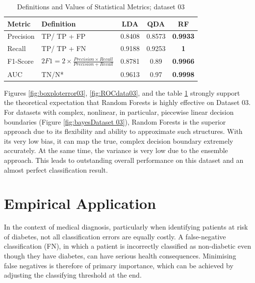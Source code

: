 \documentclass[12pt,a4paper,titlepage]{article}
\numberwithin{equation}{section}
\numberwithin{table}{section}
\numberwithin{figure}{section}
\begin{document}
        \begin{table}[h]
            \centering
            \begin{tabular}{llccc}
            \toprule
            \textbf{Metric} & \textbf{Definition} & \textbf{LDA} & \textbf{QDA} & \textbf{RF} \\
            \midrule
            Precision   & TP/ TP + FP       & 0.8408 & 0.8573 & \textbf{0.9933}                      \\
            Recall    & TP/ TP + FN       & 0.9188 &0.9253 & \textbf{1}     \\
        F1-Score  & $2F1 = 2 \times \frac{Precision\times Recall}{Precision + Recall}$      & 0.8781 & 0.89 & \textbf{0.9966}           \\
            AUC  & TN/N*      &   0.9613 & 0.97 & \textbf{0.9998}                                                \\
            \bottomrule
            \end{tabular}
            \caption{Definitions and Values of Statistical Metrics; dataset 03}
            \label{tab:metrics03}
        \end{table}
        
        \noindent Figures \ref{fig:boxploterror03}, \ref{fig:ROCdata03}, and the table \ref{tab:metrics03} strongly support the theoretical expectation that Random Forests is highly effective on Dataset 03. For datasets with complex, nonlinear, in particular, piecewise linear decision boundaries (Figure \ref{fig:bayesDataset 03}), Random Forests is the superior approach due to its flexibility and ability to approximate such structures. With its very low bias, it can map the true, complex decision boundary extremely accurately. At the same time, the variance is very low due to the ensemble approach. This leads to outstanding overall performance on this dataset and an almost perfect classification result. 

\section{Empirical Application}\label{Empirical Application}
In the context of medical diagnosis, particularly when identifying patients at risk of diabetes, not all classification errors are equally costly. A false-negative classification (FN), in which a patient is incorrectly classified as non-diabetic even though they have diabetes, can have serious health consequences. Minimising false negatives is therefore of primary importance, which can be achieved by adjusting the classifying threshold at the end.
\end{document}
